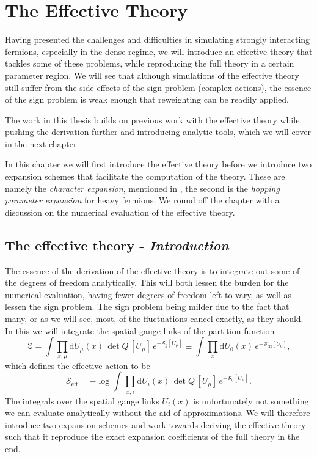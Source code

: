 \chapter{The Effective Theory} \label{chap4}

Having presented the challenges and difficulties in simulating strongly
interacting fermions, especially in the dense regime, we will introduce an
effective theory that tackles some of these problems, while reproducing the full
theory in a certain parameter region. We will see that although simulations of
the effective theory still suffer from the side effects of the sign problem
(complex actions), the essence of the sign problem is weak enough that
reweighting can be readily applied.

The work in this thesis builds on previous work with the effective theory while
pushing the derivation further and introducing analytic tools, which we will
cover in the next chapter.

In this chapter we will first introduce the effective theory before we introduce
two expansion schemes that facilitate the computation of the theory. These are
namely the \emph{character expansion}, mentioned in ,
the second is the \emph{hopping parameter expansion} for heavy fermions. We
round off the chapter with a discussion on the numerical evaluation of the
effective theory.

\section{The effective theory - \texorpdfstring{\itshape Introduction}{Introduction}}

The essence of the derivation of the effective theory is to integrate out some
of the degrees of freedom analytically. This will both lessen the burden for the
numerical evaluation, having fewer degrees of freedom left to vary, as well as
lessen the sign problem. The sign problem being milder due to the fact that
many, or as we will see, most, of the fluctuations cancel exactly, as they
should. In this we will integrate the spatial gauge links of the partition
function
%
\begin{equation}
  \mathcal{Z} = \int \prod_{x, \mu} \mathrm{d} U_{\mu}(x) \, \det Q \, [U_{\mu}] \,
    e^{-\mathcal{S}_g[U_{\mu}]}
    \equiv \int \prod_{x} \mathrm{d} U_0(x) \,
    e^{-\mathcal{S}_{\text{eff}}[U_0]},
\end{equation}
%
which defines the effective action to be
%
\begin{equation} \label{eq:eff_action_def}
  \mathcal{S}_{\text{eff}} = - \log \int \prod_{x, i} \mathrm{d} U_i(x) \, \det
    Q \, [U_{\mu}] \, e^{-\mathcal{S}_g [U_{\mu}]}.
\end{equation}
%
The integrals over the spatial gauge links $U_i(x)$ is unfortunately not
something we can evaluate analytically without the aid of approximations. We
will therefore introduce two expansion schemes and work towards deriving the
effective theory such that it reproduce the exact expansion coefficients of the
full theory in the end.

